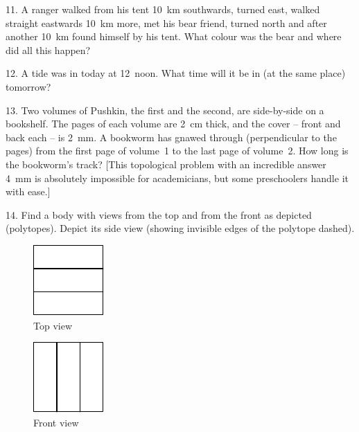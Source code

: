 \begin{problem}{11.}
	A ranger walked from his tent \SI{10}{\km} southwards, turned east, walked straight eastwards \SI{10}{\km} more,
	met his bear friend, turned north and after another \SI{10}{\km} found himself by his tent. What colour was the bear
	and where did all this happen?
\end{problem}

\begin{problem}{12.}
	A tide was in today at 12~noon. What time will it be in (at the same place) tomorrow?
\end{problem}

\begin{problem}{13.}
	Two volumes of Pushkin, the first and the second, are side-by-side on a bookshelf. The pages of each
	volume are \SI{2}{\cm} thick, and the cover -- front and back each -- is \SI{2}{\mm}. A bookworm has gnawed through
	(perpendicular to the pages) from the first page of volume~1 to the last page of volume~2. How long is the bookworm's track? [This topological problem with an incredible answer \SI{4}{\mm} is absolutely impossible for academicians,
	but some preschoolers handle it with ease.]
\end{problem}

\begin{problem}{14.}
	Find a body with views from the top and from the front as depicted (polytopes).
	Depict its side view (showing invisible edges of the polytope dashed).
	\begin{figure}
		\footnotesize
		\null\hfill
		\parbox{0.2\linewidth}{\centering\includegraphics{taskbook-99}\\Top view}
		\hfill
		\parbox{0.2\linewidth}{\centering\includegraphics{taskbook-98}\\Front view}
		\hfill\null
	\end{figure}
\end{problem}

